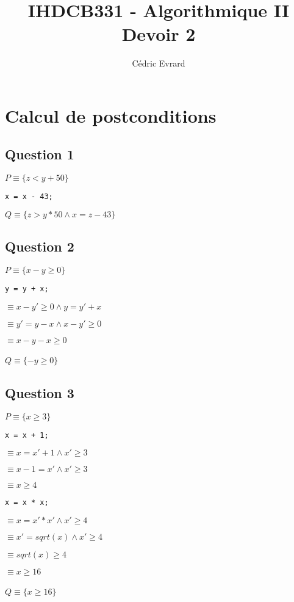 \documentclass[11pt]{article}
\title{IHDCB331 - Algorithmique II\\
	\large{Devoir 2}
}
\author{Cédric Evrard}
\begin{document}
\maketitle

\section{Calcul de postconditions}
\subsection{Question 1}
$P \equiv \{z < y+50 \}$
\begin{lstlisting}[style=CStyle]
x = x - 43;
\end{lstlisting}
$Q \equiv \{z > y * 50 \land x = z - 43 \}$

\subsection{Question 2}
$P \equiv \{x - y \geq 0 \}$
\begin{lstlisting}[style=CStyle]
y = y + x;
\end{lstlisting}

$\equiv x - y' \geq 0 \land y = y' + x$

$\equiv y' = y - x \land x - y' \geq 0$

$\equiv x - y - x \geq 0$\\\\
$Q \equiv \{-y \geq 0 \}$

\subsection{Question 3}
$P \equiv \{x \geq 3 \}$
\begin{lstlisting}[style=CStyle]
x = x + 1;
\end{lstlisting}

$\equiv x = x' + 1 \land x' \geq 3$

$\equiv x - 1 = x' \land x' \geq 3$

$\equiv x \geq 4$
\begin{lstlisting}[style=CStyle]
x = x * x;
\end{lstlisting}

$\equiv x = x' * x' \land x' \geq 4$

$\equiv x' = sqrt(x) \land x' \geq 4$

$\equiv sqrt(x) \geq 4$

$\equiv x \geq 16$\\\\
$Q \equiv \{x \geq 16\}$
\end{document}
